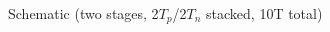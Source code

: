 \begin{center}
    Schematic (two stages, 2$T_{p}$/2$T_{n}$ stacked, 10T total)
    \begin{figure}[h] %
        \begin{center}
            \begin{circuitdiagram}{24}{27}



            \end{circuitdiagram}
        \end{center}
    \end{figure}
\end{center}
